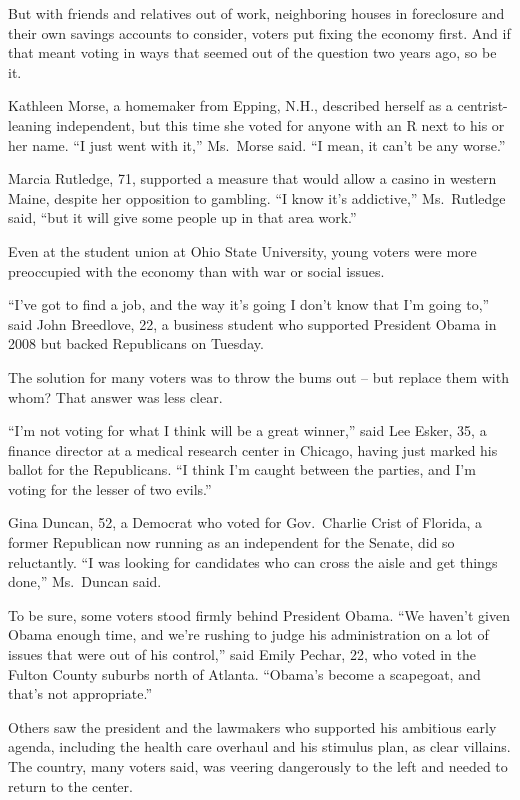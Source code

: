 ﻿\documentclass[12pt]{article}
\begin{document}
But with friends and relatives out of work, neighboring houses in foreclosure and their own savings
accounts to consider, voters put fixing the economy first. And if that meant voting in ways that
seemed out of the question two years ago, so be it.

Kathleen Morse, a homemaker from Epping, N.H., described herself as a centrist-leaning independent,
but this time she voted for anyone with an R next to his or her name. ``I just went with it,''
Ms.~Morse said. ``I mean, it can't be any worse.''

Marcia Rutledge, 71, supported a measure that would allow a casino in western Maine, despite her
opposition to gambling. ``I know it's addictive,'' Ms.~Rutledge said, ``but it will give some people
up in that area work.''

Even at the student union at Ohio State University, young voters were more preoccupied with the
economy than with war or social issues.

``I've got to find a job, and the way it's going I don't know that I'm going to,'' said John
Breedlove, 22, a business student who supported President Obama in 2008 but backed Republicans on
Tuesday.

The solution for many voters was to throw the bums out -- but replace them with whom? That answer
was less clear.

``I'm not voting for what I think will be a great winner,'' said Lee Esker, 35, a finance director
at a medical research center in Chicago, having just marked his ballot for the Republicans. ``I
think I'm caught between the parties, and I'm voting for the lesser of two evils.''

Gina Duncan, 52, a Democrat who voted for Gov.~Charlie Crist of Florida, a former Republican now
running as an independent for the Senate, did so reluctantly. ``I was looking for candidates who can
cross the aisle and get things done,'' Ms.~Duncan said.

To be sure, some voters stood firmly behind President Obama. ``We haven't given Obama enough time,
and we're rushing to judge his administration on a lot of issues that were out of his control,''
said Emily Pechar, 22, who voted in the Fulton County suburbs north of Atlanta. ``Obama's become a
scapegoat, and that's not appropriate.''

Others saw the president and the lawmakers who supported his ambitious early agenda, including the
health care overhaul and his stimulus plan, as clear villains. The country, many voters said, was
veering dangerously to the left and needed to return to the center.
\end{document}

